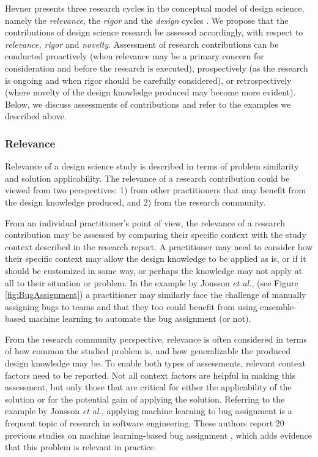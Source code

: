 \documentclass[graybox]{svmult}
\begin{document}
Hevner presents three research cycles in  the conceptual model of design science, namely the \emph{relevance},   the \emph{rigor} and the \emph{design} cycles \cite{Hevner2007}. We propose that the contributions of design science research be assessed accordingly, with respect to \emph{relevance, rigor} and \emph{novelty}. 
Assessment of research contributions can be conducted proactively (when relevance may be a primary concern for consideration and before the research is executed), prospectively (as the research is ongoing and when rigor should be carefully considered), or retrospectively (where novelty of the design knowledge produced may become more evident).
Below, we discuss assessments of contributions and refer to the examples we described above.




\subsubsection{Relevance} 

Relevance of a design science study is described in terms of problem similarity and solution applicability. The relevance of a research contribution could be viewed from two perspectives: 1) from other practitioners that may benefit from the design knowledge produced, and 2) from the research community. 

From an individual practitioner's point of view, the relevance of a research contribution may be assessed by comparing their specific context with the study context described in the research report. 
A practitioner may need to consider how their specific context may allow the design knowledge to be applied as is, or if it should be customized in some way, or perhaps the knowledge may not apply at all to their situation or problem.
In the example by Jonsson \emph{et al.}, (see Figure \ref{fig:BugAssignment}) a practitioner may  similarly face the challenge of manually assigning bugs to teams and  that they too could benefit from using ensemble-based machine learning to automate the bug assignment (or not).

From the research community perspective, relevance is often considered in terms of how common the studied problem is, and how generalizable the produced design knowledge may be. To enable both types of assessments, relevant context factors need to be reported. Not all context factors are helpful in making this assessment, but only those that are critical for either the applicability of the solution or for the potential gain of applying the solution. 
Referring to the example by Jonsson \emph{et al.}, applying machine learning to bug assignment is  a frequent topic of research in software engineering. These authors report 20 previous studies on machine learning-based bug assignment \cite[Fig.2]{JonssonBug15}, which adds evidence that this problem is relevant in practice.
\end{document}
